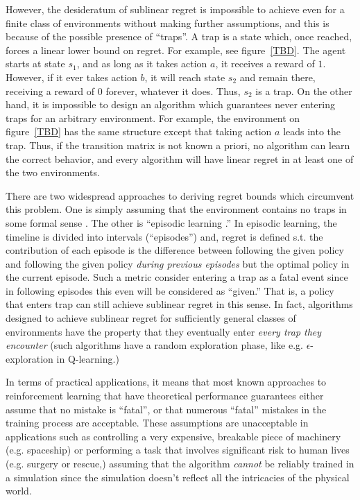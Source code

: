\documentclass[11pt]{article}
\theoremstyle{definition}
\theoremstyle{plain}
\begin{document}
However, the desideratum of sublinear regret is impossible to achieve even for a finite class of environments without making further assumptions, and this is because of the possible presence of \enquote{traps}. A trap is a state which, once reached, forces a linear lower bound on regret. For example, see figure~\ref{TBD}. The agent starts at state $s_1$, and as long as it takes action $a$, it receives a reward of $1$. However, if it ever takes action $b$, it will reach state $s_2$ and remain there, receiving a reward of $0$ forever, whatever it does. Thus, $s_2$ is a trap. On the other hand, it is impossible to design an algorithm which guarantees never entering traps for an arbitrary environment. For example, the environment on figure~\ref{TBD} has the same structure except that taking action $a$ leads into the trap. Thus, if the transition matrix is not known a priori, no algorithm can learn the correct behavior, and every algorithm will have linear regret in at least one of the two environments.

There are two widespread approaches to deriving regret bounds which circumvent this problem. One is simply assuming that the environment contains no traps in some formal sense \cite{TBD}. The other is \enquote{episodic learning \cite{TBD}.} In episodic learning, the timeline is divided into intervals (\enquote{episodes}) and, regret is defined s.t. the contribution of each episode is the difference between following the given policy and following the given policy \emph{during previous episodes} but the optimal policy in the current episode. Such a metric consider entering a trap as a fatal event since in following episodes this even will be considered as \enquote{given.} That is, a policy that enters trap can still achieve sublinear regret in this sense. In fact, algorithms designed to achieve sublinear regret for sufficiently general classes of environments have the property that they eventually enter \emph{every trap they encounter} (such algorithms have a random exploration phase, like e.g. $\epsilon$-exploration in Q-learning.)

In terms of practical applications, it means that most known approaches to reinforcement learning that have theoretical performance guarantees either assume that no mistake is \enquote{fatal}, or that numerous \enquote{fatal} mistakes in the training process are acceptable. These assumptions are unacceptable in applications such as controlling a very expensive, breakable piece of machinery (e.g. spaceship) or performing a task that involves significant risk to human lives (e.g. surgery or rescue,) assuming that the algorithm \emph{cannot} be reliably trained in a simulation since the simulation doesn't reflect all the intricacies of the physical world.
\end{document}
